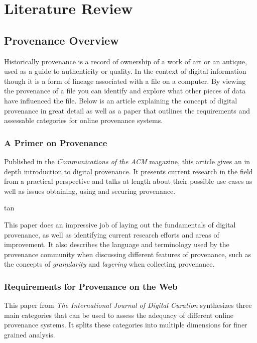 \chapter{Literature Review}

\section{Provenance Overview}
\label{sec:provenance_overview}

Historically provenance is a record of ownership of a work of art or an antique, used as a guide to authenticity or quality. In the context of digital information though it is a form of lineage associated with a file on a computer. By viewing the provenance of a file you can identify and explore what other pieces of data have influenced the file. Below is an article explaining the concept of digital provenance in great detail as well as a paper that outlines the requirements and assessable categories for online provenance systems.

\subsection{A Primer on Provenance\cite{Carata2014}}
\label{sub:a_primer_on_provenance}

Published in the \textit{Communications of the ACM} magazine, this article gives an in depth introduction to digital provenance. It presents current research in the field from a practical perspective and talks at length about their possible use cases as well as issues obtaining, using and securing provenance.

tan

This paper does an impressive job of laying out the fundamentals of digital provenance, as well as identifying current research efforts and areas of improvement. It also describes the language and terminology used by the provenance community when discussing different features of provenance, such as the concepts of \textit{granularity} and \textit{layering} when collecting provenance.

\subsection{Requirements for Provenance on the Web\cite{Groth2012}}
\label{sub:requirements_for_provenance_on_the_web}

This paper from \textit{The International Journal of Digital Curation} synthesizes three main categories that can be used to assess the adequacy of different online provenance systems. It splits these categories into multiple dimensions for finer grained analysis.

